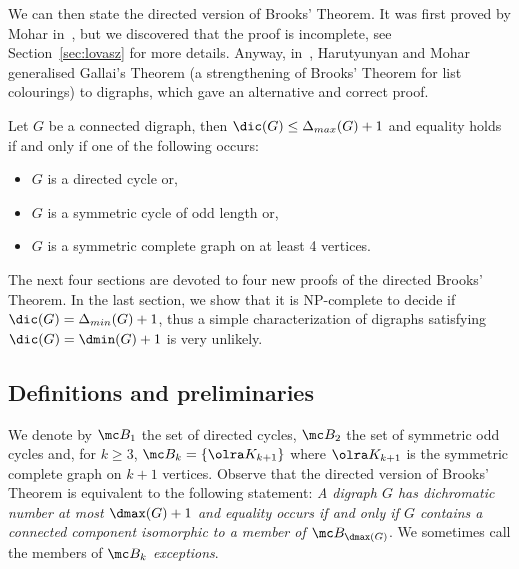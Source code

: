 We can then state the directed version of Brooks' Theorem. 
It was first proved by Mohar in~\cite{M10}, but we discovered that the proof is incomplete, see Section~\ref{sec:lovasz} for more details. Anyway, in~\cite{HMGallai}, Harutyunyan and Mohar generalised Gallai's Theorem  (a strengthening of Brooks' Theorem for list colourings) to digraphs, which gave an alternative and correct proof. 

\begin{theorem}\label{brooks_max_oriented}
Let $G$ be a connected digraph, then $\dic(G) \leq \Delta_{max}(G) + 1$ and equality holds if and only if one of the following occurs:
\begin{itemize}
\item[(a)] $G$ is a directed cycle or,
\item[(b)] $G$ is a symmetric cycle of odd length or,
\item[(c)] $G$ is a symmetric complete graph on at least 4 vertices.
\end{itemize}
\end{theorem}


The next four sections are devoted to four new proofs of the directed Brooks' Theorem. 
In the last section, we show that  it is NP-complete to decide if $\dic(G) = \Delta_{min}(G) +1$, thus a simple characterization of digraphs satisfying $\dic(G) = \dmin(G) +1$ is very unlikely. 


\subsection{Definitions and preliminaries} \label{subsec:def}

We denote by $\mc B_{1}$ the set of directed cycles, $\mc B_{2}$ the set of symmetric odd cycles and, for $k \geq 3$, $\mc B_{k} = \{\olra K_{k+1}\}$ where $\olra K_{k+1}$ is the symmetric complete graph on $k + 1$ vertices.
Observe that the directed version of Brooks' Theorem is equivalent to the following statement: \emph{A digraph $G$ has dichromatic number at most $\dmax(G) +1$ and equality occurs if and only if $G$ contains a connected component isomorphic to a member of $\mc B_{\dmax(G)}$}. 
We sometimes call the members of $\mc B_k$ \emph{exceptions}.
\medskip

